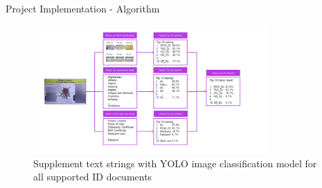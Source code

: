 \documentclass[aspectratio=169,xcolor=dvipsnames]{beamer}
\begin{document}
\begin{frame}{Project Implementation - Algorithm}
    \tableofcontents


  \begin{figure}
   \includegraphics[width=340]{dia.jpg}
      \caption{Supplement text strings with YOLO image classification model for all supported ID documents}
\end{figure}

\end{frame}
\end{document}
